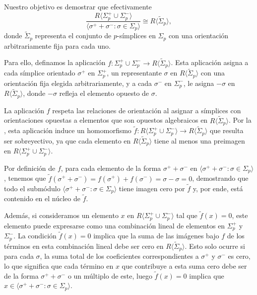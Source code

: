 Nuestro objetivo es demostrar que efectivamente
\[
\frac{R\langle \Sigma_{p}^{+}\cup \Sigma_{p}^{-}\rangle}{\langle \sigma^{+}+
	\sigma^{-}: \sigma \in \Sigma_{p}\rangle}\cong R \langle \tilde{\Sigma}_{p}\rangle
,
\]
donde \(\tilde{\Sigma}_{p}\) representa el conjunto de \(p\)-símplices en \(\Sigma_{p}\)
con una orientación arbitrariamente fija para cada uno.

Para ello, definamos la aplicación
\(f : \Sigma^{+}_{p}\cup \Sigma^{-}_{p}\to R \langle \tilde{\Sigma}_{p}\rangle\). Esta
aplicación asigna a cada símplice orientado \(\sigma^{+}\) en \(\Sigma_{p}^{+}\), un
representante \(\sigma\) en \(R \langle \tilde{\Sigma}_{p}\rangle\) con una
orientación fija elegida arbitrariamente, y a cada \(\sigma^{-}\) en \(\Sigma_{p}^{-}\),
le asigna \(-\sigma\) en \(R \langle \tilde{\Sigma}_{p}\rangle\), donde \(-\sigma\) refleja
el elemento opuesto de \(\sigma\).

La aplicación \(f\) respeta las relaciones de orientación al asignar a símplices con
orientaciones opuestas a elementos que son opuestos algebraicos en \(R \langle \tilde
{\Sigma}_{p}\rangle\). Por la , esta aplicación
induce un homomorfismo
\(\tilde{f}: R\langle \Sigma_{p}^{+}\cup \Sigma_{p}^{-}\rangle \to R \langle \tilde
{\Sigma}_{p}\rangle\)
que resulta ser sobreyectivo, ya que cada elemento en \(R \langle \tilde{\Sigma}_{p}
\rangle\) tiene al menos una preimagen en \(R\langle \Sigma_{p}^{+}\cup \Sigma_{p}^{-}
\rangle\).

Por definición de \(f\), para cada elemento de la forma \(\sigma^{+}+ \sigma^{-}\)
en \(\langle \sigma^{+}+ \sigma^{-}: \sigma \in \Sigma_{p}\rangle\), tenemos que \(\tilde
{f}(\sigma^{+}+ \sigma^{-}) = f(\sigma^{+}) + f(\sigma^{-}) = \sigma - \sigma = 0\),
demostrando que todo el submódulo
\(\langle \sigma^{+}+ \sigma^{-}: \sigma \in \Sigma_{p}\rangle\) tiene imagen cero
por \(\tilde{f}\) y, por ende, está contenido en el núcleo de \(\tilde{f}\).

Además, si consideramos un elemento \(x\) en \(R\langle \Sigma_{p}^{+}\cup \Sigma_{p}
^{-}\rangle\) tal que \(\tilde{f}(x) = 0\), este elemento puede expresarse como una
combinación lineal de elementos en \(\Sigma_{p}^{+}\) y \(\Sigma_{p}^{-}\). La condición
\(\tilde{f}(x) = 0\) implica que la suma de las imágenes bajo \(f\) de los términos en
esta combinación lineal debe ser cero en \(R \langle \tilde{\Sigma}_{p}\rangle\).
Esto solo ocurre si para cada \(\sigma\), la suma total de los coeficientes correspondientes
a \(\sigma^{+}\) y \(\sigma^{-}\) es cero, lo que significa que cada término en \(x\)
que contribuye a esta suma cero debe ser de la forma \(\sigma^{+}+ \sigma^{-}\) o
un múltiplo de este, luego \(\tilde{f}(x) = 0\) implica que \(x \in \langle \sigma^{+}
+ \sigma^{-}: \sigma \in \Sigma_{p}\rangle\).

